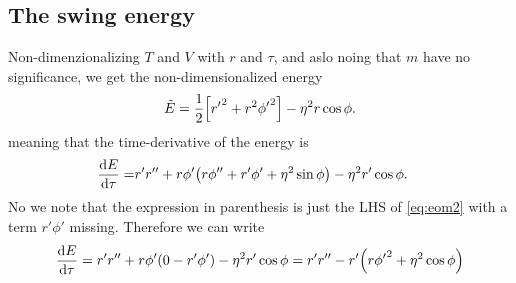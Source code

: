 \documentclass[11pt,letter, swedish, english
]{article}
\newcommand{\tE}{\tilde{E}}
\begin{document}
\subsection{The swing energy}
Non-dimenzionalizing $T$ and $V$ with $r$ and $\tau$, and aslo noing
that $m$ have no significance, we get the non-dimensionalized energy
\begin{equation}
\tE=\frac{1}{2}\qty[{r'}^2 + {r}^2{\phi'}^2] - \eta^2 r \cos\phi.
\end{equation}
meaning that the time-derivative of the energy is
\begin{equation}
\begin{aligned}
\dv{E}{\tau}%
=&r'r''+r\phi'\qty(r\phi'' + r'\phi' + \eta^2\sin\phi) 
-\eta^2r'\cos\phi.
\end{aligned}
\end{equation}
No we note that the expression in parenthesis is just the LHS of
\eqref{eq:eom2} with a term $r'\phi'$ missing. Therefore we can write
\begin{equation}\label{eq:dE/dtau1}
\dv{E}{\tau}
=r'r''+r\phi'\qty(0-r'\phi')-\eta^2r'\cos\phi
=r'r'' - r'%
\qty(r{\phi'}^2 + \eta^2\cos\phi)
\end{equation}

\end{document}

